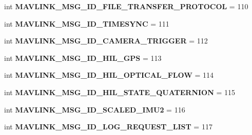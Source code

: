 \begin{DoxyCompactItemize}
int {\bfseries M\+A\+V\+L\+I\+N\+K\+\_\+\+M\+S\+G\+\_\+\+I\+D\+\_\+\+F\+I\+L\+E\+\_\+\+T\+R\+A\+N\+S\+F\+E\+R\+\_\+\+P\+R\+O\+T\+O\+C\+OL} = 110
\item 
\mbox{\label{namespacepymavlink_1_1dialects_1_1v10_aa80fde508e61563ec195cfd848933b50}} 
int {\bfseries M\+A\+V\+L\+I\+N\+K\+\_\+\+M\+S\+G\+\_\+\+I\+D\+\_\+\+T\+I\+M\+E\+S\+Y\+NC} = 111
\item 
\mbox{\label{namespacepymavlink_1_1dialects_1_1v10_a3b602898916df804e642d26f0e96cfc2}} 
int {\bfseries M\+A\+V\+L\+I\+N\+K\+\_\+\+M\+S\+G\+\_\+\+I\+D\+\_\+\+C\+A\+M\+E\+R\+A\+\_\+\+T\+R\+I\+G\+G\+ER} = 112
\item 
\mbox{\label{namespacepymavlink_1_1dialects_1_1v10_ac4cea12754453c3eaa50da1dcd513615}} 
int {\bfseries M\+A\+V\+L\+I\+N\+K\+\_\+\+M\+S\+G\+\_\+\+I\+D\+\_\+\+H\+I\+L\+\_\+\+G\+PS} = 113
\item 
\mbox{\label{namespacepymavlink_1_1dialects_1_1v10_a80c5489b84c05a28533eeae78fd602f3}} 
int {\bfseries M\+A\+V\+L\+I\+N\+K\+\_\+\+M\+S\+G\+\_\+\+I\+D\+\_\+\+H\+I\+L\+\_\+\+O\+P\+T\+I\+C\+A\+L\+\_\+\+F\+L\+OW} = 114
\item 
\mbox{\label{namespacepymavlink_1_1dialects_1_1v10_a0e87126ca81259806e7240c0da01f6a4}} 
int {\bfseries M\+A\+V\+L\+I\+N\+K\+\_\+\+M\+S\+G\+\_\+\+I\+D\+\_\+\+H\+I\+L\+\_\+\+S\+T\+A\+T\+E\+\_\+\+Q\+U\+A\+T\+E\+R\+N\+I\+ON} = 115
\item 
\mbox{\label{namespacepymavlink_1_1dialects_1_1v10_a20478e4707ec2418a33ef120db3a9e3a}} 
int {\bfseries M\+A\+V\+L\+I\+N\+K\+\_\+\+M\+S\+G\+\_\+\+I\+D\+\_\+\+S\+C\+A\+L\+E\+D\+\_\+\+I\+M\+U2} = 116
\item 
\mbox{\label{namespacepymavlink_1_1dialects_1_1v10_a659a0b0da09d244bafef4da2aa95c1a9}} 
int {\bfseries M\+A\+V\+L\+I\+N\+K\+\_\+\+M\+S\+G\+\_\+\+I\+D\+\_\+\+L\+O\+G\+\_\+\+R\+E\+Q\+U\+E\+S\+T\+\_\+\+L\+I\+ST} = 117
\item 
\mbox{\label{namespacepymavlink_1_1dialects_1_1v10_ad4c56b378412efae93fb5d00b91a6c4f}} 

\end{DoxyCompactItemize}
